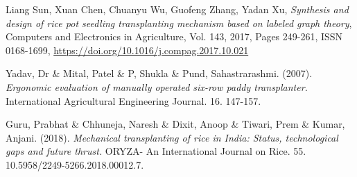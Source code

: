 \begin{thebibliography}{999}

        Liang Sun, Xuan Chen, Chuanyu Wu, Guofeng Zhang, Yadan Xu, 
        \emph{Synthesis and design of rice pot seedling transplanting mechanism based on labeled graph theory},
        Computers and Electronics in Agriculture,
        Vol. 143,
        2017,
        Pages 249-261,
        ISSN 0168-1699,
        \href{https://doi.org/10.1016/j.compag.2017.10.021}{https://doi.org/10.1016/j.compag.2017.10.021}
        
        Yadav, Dr \& Mital, Patel \& P, Shukla \& Pund, Sahastrarashmi. (2007). \emph{Ergonomic evaluation of manually operated six-row paddy transplanter.} International Agricultural Engineering Journal. 16. 147-157. 
    
        Guru, Prabhat \& Chhuneja, Naresh \& Dixit, Anoop \& Tiwari, Prem \& Kumar, Anjani. (2018). \emph{Mechanical transplanting of rice in India: Status, technological gaps and future thrust.} ORYZA- An International Journal on Rice. 55. 10.5958/2249-5266.2018.00012.7. 
    
\end{thebibliography}